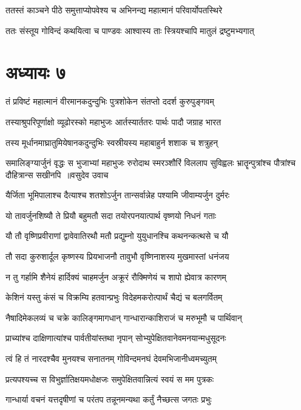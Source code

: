 \twolineshloka
{ततस्तं काञ्चने पीठे समुत्ताप्योपवेश्य च}
{अभिनन्द्य महात्मानं परिवार्योपतस्थिरे}


\twolineshloka
{ततः संस्तूय गोविन्दं कथयित्वा च पाण्डवः}
{आश्वास्य ताः स्त्रियश्चापि मातुलं द्रष्टुमभ्यगात्}


\chapter{अध्यायः ७}
\twolineshloka
{तं प्रविष्टं महात्मानं वीरमानकदुन्दुभिः}
{पुत्रशोकेन संतप्तो ददर्श कुरुपुङ्गवम्}


\twolineshloka
{तस्याश्रुपरिपूर्णाक्षो व्यूढोरस्को महाभुजः}
{आर्तस्यार्ततरः पार्थः पादौ जग्राह भारत}


\twolineshloka
{तस्य मूर्धानमाघ्रातुमियेषानकदुन्दुभिः}
{स्वस्रीयस्य महाबाहुर्न शशाक च शत्रुहन्}


\fourlineindentedshloka
{समालिङ्ग्यार्जुनं वृद्धः स भुजाभ्यां महाभुजः}
{रुरोदाथ स्मरञ्शौरिं विललाप सुविह्वलः}
{भ्रातॄन्पुत्रांश्च पौत्रांश्च दौहित्रान्स सखीनपि ॥वसुदेव उवाच}
{}


\twolineshloka
{यैर्जिता भूमिपालाश्च दैत्याश्च शतशोऽर्जुन}
{तान्सर्वान्नेह पश्यामि जीवाम्यर्जुन दुर्मरः}


\twolineshloka
{यो तावर्जुनशिष्यौ ते प्रियौ बहुमतौ सदा}
{तयोरपनयात्पार्थ वृष्णयो निधनं गताः}


\twolineshloka
{यौ तौ वृष्णिप्रवीराणां द्वावेवातिरथौ मतौ}
{प्रद्युम्नो युयुधानश्चि कथनन्कत्थसे च यौ}


\twolineshloka
{तौ सदा कुरुशार्दूल कृष्णस्य प्रियभाजनौ}
{तावुभौ वृष्णिनाशस्य मुखमास्तां धनंजय}


\twolineshloka
{न तु गर्हामि शैनेयं हार्दिक्यं चाहमर्जुन}
{अक्रूरं रौक्मिणेयं च शापो ह्येवात्र कारणम्}


\twolineshloka
{केशिनं यस्तु कंसं च विक्रम्यि हतवान्प्रभुः}
{विदेहमकरोत्पार्थं चैद्यं च बलगर्वितम्}


\twolineshloka
{नैषादिमेकलव्यं च चक्रे कालिङ्गमागधान्}
{गान्धारान्काशिराजं च मरुभूमौ च पार्थिवान्}


\twolineshloka
{प्राच्यांश्च दाक्षिणात्यांश्च पार्वतीयांस्तथा नृपान्}
{सोभ्युपेक्षितवानेवमनयान्मधुसूदनः}


\twolineshloka
{त्वं हि तं नारदश्चैव मुनयश्च सनातनम्}
{गोविन्दमनघं देवमभिजानीध्वमच्युतम्}


\twolineshloka
{प्रत्यपश्यच्च स विभुर्ज्ञातिक्षयमधोक्षजः}
{समुपेक्षितवान्नित्यं स्वयं स मम पुत्रकः}


\twolineshloka
{गान्धार्या वचनं यत्तदृषीणां च परंतप}
{तन्नूनमन्यथा कर्तुं नैच्छत्स जगतः प्रभुः}


